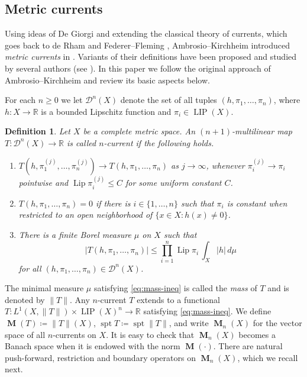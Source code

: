 \documentclass[reqno]{amsart}
\newtheorem{definition}[theorem]{Definition}
\numberwithin{equation}{section}
\newcommand{\R}{\mathbb{R}}
\newcommand{\spt}{\operatorname{spt}}
\newcommand{\Lip}{\operatorname{Lip}}
\newcommand{\LIP}{\operatorname{LIP}}
\newcommand{\norm}[1]{\lVert#1\rVert}
\newcommand{\abs}[1]{\lvert#1\rvert}
\DeclareMathOperator{\mass}{\mathbf{M}}
\begin{document}
\subsection{Metric currents}\label{sec:metric-currents}
Using ideas of De Giorgi \cite{de-giorgi-1995} and extending the classical theory of currents, which goes back to de Rham and Federer--Fleming \cite{de-Rham-1955,fed60}, Ambrosio--Kirchheim  introduced \emph{metric currents} in \cite{amb00}. Variants of their definitions have been proposed and studied by several authors (see \cite{lan11,lang-wenger-2011,williams-2012,zust-2019}). In this paper we follow the original approach of Ambrosio--Kirchheim and review its basic aspects below.

For each \(n\geq 0\) we let \(\mathcal{D}^n(X)\) denote the set of all tuples \((h, \pi_1, \dots, \pi_n)\), where \(h\colon X\to \R\) is a bounded Lipschitz function and \(\pi_i\in \LIP(X)\). 
\begin{definition}\label{def:current}
Let $X$ be a complete metric space. An \((n+1)\)-multilinear map \(T\colon \mathcal{D}^n(X)\to \R\) is called \(n\)-current if the following holds.

\begin{enumerate}
    \item\label{ax:1} \(T(h, \pi_1^{(j)}, \dots, \pi_n^{(j)}) \to T(h, \pi_1, \dots, \pi_n)\) as \(j\to \infty\), whenever \(\pi_i^{(j)}\to \pi_i\) pointwise and \(\Lip \pi_i^{(j)} \leq C\) for some uniform constant \(C\).
    \item\label{ax:2} \(T(h, \pi_1, \dots, \pi_n)=0\) if there is \(i\in \{1, \dots, n\}\) such that \(\pi_i\) is constant when restricted to an open neighborhood of \(\{ x\in X : h(x)\neq 0\}\).
    \item\label{ax:3} There is a finite Borel measure \(\mu\) on \(X\) such that
    \begin{equation}\label{eq:mass-ineq}
            \abs{T(h, \pi_1, \dots, \pi_n)} \leq \prod_{i=1}^n \Lip \pi_i \, \int_X \abs{h} \, d\mu
    \end{equation}
    for all \((h, \pi_1,\dots, \pi_n)\in \mathcal{D}^n(X)\).
\end{enumerate}
\end{definition}

The minimal measure $\mu$ satisfying \eqref{eq:mass-ineq} is called the \emph{mass} of $T$ and is denoted by $\norm{T}$. Any \(n\)-current $T$ extends to a functional $T:L^1(X, \|T\|)\times \LIP(X)^n\to\R$ satisfying \eqref{eq:mass-ineq}. We define \(\mass(T)\coloneqq\norm{T}(X)\), \(\spt T\coloneqq \spt \norm{T}\), and write \(\mass_n(X)\) for the vector space of all \(n\)-currents on \(X\). It is easy to check that \(\mass_n(X)\) becomes a Banach space when it is endowed with the norm \(\mass(\cdot)\). 
There are natural push-forward, restriction and boundary operators on \(\mass_n(X)\), which we recall next.
\end{document}
